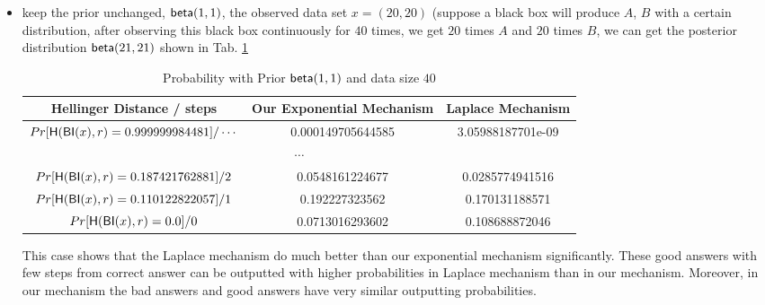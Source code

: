\documentclass[sigconf]{acmart}
\begin{document}
\begin{itemize}
\begin{itemize}
		\item keep the prior unchanged, $\mathsf{beta}(1,1)$, the observed data set $x = (20,20)$ (suppose a black box will produce $A$, $B$ with a certain distribution, after observing this black box continuously for $40$ times, we get $20$ times $A$ and $20$ times $B$, we can get the posterior distribution $\mathsf{beta}(21,21)$ shown in Tab. \ref{tab_40}

		\begin{center}
		\begin{table}
		 \begin{tabular}{c | c | c} 
		 \hline
		 Hellinger Distance / steps & Our Exponential Mechanism & Laplace Mechanism  \\
		 \hline\hline
		 $Pr[\mathsf{H}(\mathsf{BI}(x), r) = 0.999999984481] / \cdots 	$ & 0.000149705644585 & 3.05988187701e-09\\ 
		 \hline
		 \multicolumn{3}{c}{$\cdots$}  \\
		 \hline
		 $Pr[\mathsf{H}(\mathsf{BI}(x), r) = 0.187421762881] / 2		$ & 0.0548161224677 & 0.0285774941516 \\
		 \hline
		 $Pr[\mathsf{H}(\mathsf{BI}(x), r) = 0.110122822057 ] / 1		$ & 0.192227323562 & 0.170131188571  \\
		 \hline
		 $Pr[\mathsf{H}(\mathsf{BI}(x), r) = 0.0 ] / 0 					$ & 0.0713016293602 & 0.108688872046 \\
		 \hline
		\end{tabular}
		\caption{Probability with Prior $\mathsf{beta}(1,1)$ and data size $40$}
		\label{tab_40}
		\end{table}
		\end{center}

		This case shows that the Laplace mechanism do much better than our exponential mechanism significantly. These good answers with few steps from correct answer can be outputted with higher probabilities in Laplace mechanism than in our mechanism. Moreover, in our mechanism the bad answers and good answers have very similar outputting probabilities.



\end{itemize}
\end{itemize}
\end{document}
